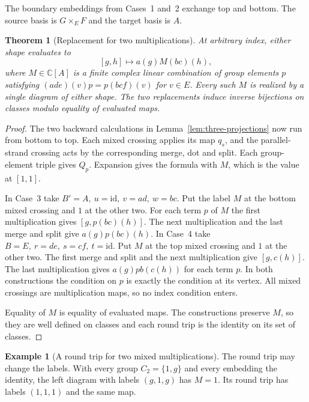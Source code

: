 \documentclass[11pt,a4paper]{article}
\numberwithin{equation}{section}
\newtheorem{theorem}{Theorem}[section]
\theoremstyle{definition}
\newtheorem{example}{Example}[section]
\newcommand{\C}{\mathbb C}
\newcommand{\id}{\mathrm{id}}
\begin{document}
The boundary embeddings from Cases~1 and~2 exchange top and bottom.
The source basis is \(G\times_E F\) and the target basis is \(A\).

\begin{theorem}[Replacement for two multiplications]\label{thm:three-multiplications}
At arbitrary index, either shape evaluates to
\[
 [g,h]\longmapsto a(g)M(bc)(h),
\]
where \(M\in\C[A]\) is a finite complex linear combination of group elements \(p\) satisfying
\((ade)(v)p=p(bcf)(v)\) for \(v\in E\).
Every such \(M\) is realized by a single diagram of either shape.
The two replacements induce inverse bijections on classes modulo
equality of evaluated maps.
\end{theorem}

\begin{proof}
The two backward calculations in Lemma~\ref{lem:three-projections}
now run from bottom to top. Each mixed crossing applies its map
\(q_s\), and the parallel-strand crossing acts by the corresponding
merge, dot and split. Each group-element triple gives \(Q_p\).
Expansion gives the formula with \(M\), which is the value at \([1,1]\).

In Case~3 take \(B'=A,\ u=\id,\ v=ad,\ w=bc\). Put the label \(M\)
at the bottom mixed crossing and \(1\) at the other two. For each term
\(p\) of \(M\) the first multiplication gives \([g,p(bc)(h)]\).
The next multiplication and the last merge and split give
\(a(g)p(bc)(h)\). In Case~4 take \(B=E,\ r=de,\ s=cf,\ t=\id\).
Put \(M\) at the top mixed crossing and \(1\) at the other two.
The first merge and split and the next multiplication give \([g,c(h)]\).
The last multiplication gives \(a(g)p b(c(h))\) for each term \(p\).
In both constructions the condition on \(p\) is exactly the condition
at its vertex. All mixed crossings are multiplication maps, so no
index condition enters.

Equality of \(M\) is equality of evaluated maps. The constructions
preserve \(M\), so they are well defined on classes and each round
trip is the identity on its set of classes.
\end{proof}


\begin{example}[A round trip for two mixed multiplications]\label{ex:multiplication-round-trip}
The round trip may change the labels. With every group \(C_2=\{1,g\}\)
and every embedding the identity, the left diagram with labels
\((g,1,g)\) has \(M=1\). Its round trip has labels \((1,1,1)\)
and the same map.
\end{example}
\end{document}
